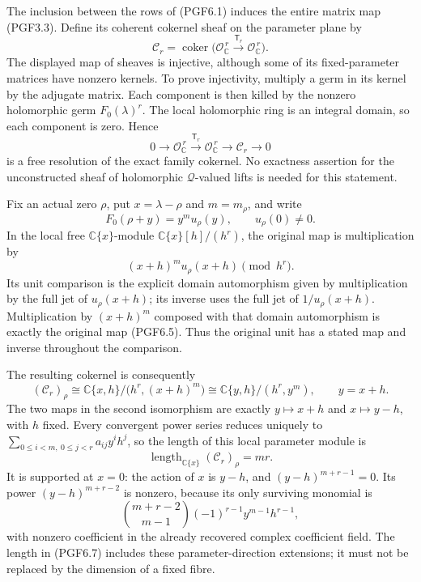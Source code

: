 The inclusion between the rows of (PGF6.1) induces the entire matrix map
(PGF3.3). Define its coherent cokernel sheaf on the parameter plane by
\[
\mathscr C_r=
\operatorname{coker}\bigl(\mathcal O_{\mathbb C}^{\,r}
\xrightarrow{\mathsf T_r}\mathcal O_{\mathbb C}^{\,r}\bigr).
\tag{PGF6.2}
\] The displayed map of sheaves is injective, although some of its
fixed-parameter matrices have nonzero kernels. To prove injectivity,
multiply a germ in its kernel by the adjugate matrix. Each component is
then killed by the nonzero holomorphic germ \(F_0(\lambda)^r\). The
local holomorphic ring is an integral domain, so each component is zero.
Hence \[
0\to\mathcal O_{\mathbb C}^{\,r}
\xrightarrow{\mathsf T_r}\mathcal O_{\mathbb C}^{\,r}
\to\mathscr C_r\to0
\tag{PGF6.3}
\] is a free resolution of the exact family cokernel. No exactness
assertion for the unconstructed sheaf of holomorphic
\(\mathcal Q\)-valued lifts is needed for this statement.

Fix an actual zero \(\rho\), put \(x=\lambda-\rho\) and \(m=m_\rho\),
and write \[
F_0(\rho+y)=y^m u_\rho(y),\qquad u_\rho(0)\ne0.
\tag{PGF6.4}
\] In the local free \(\mathbb C\{x\}\)-module
\(\mathbb C\{x\}[h]/(h^r)\), the original map is multiplication by \[
(x+h)^m u_\rho(x+h)\pmod{h^r}.
\tag{PGF6.5}
\] Its unit comparison is the explicit domain automorphism given by
multiplication by the full jet of \(u_\rho(x+h)\); its inverse uses the
full jet of \(1/u_\rho(x+h)\). Multiplication by \((x+h)^m\) composed
with that domain automorphism is exactly the original map (PGF6.5). Thus
the original unit has a stated map and inverse throughout the
comparison.

The resulting cokernel is consequently \[
(\mathscr C_r)_\rho
\cong \mathbb C\{x,h\}/\bigl(h^r,(x+h)^m\bigr)
\cong \mathbb C\{y,h\}/(h^r,y^m),\qquad y=x+h.
\tag{PGF6.6}
\] The two maps in the second isomorphism are exactly \(y\mapsto x+h\)
and \(x\mapsto y-h\), with \(h\) fixed. Every convergent power series
reduces uniquely to \(\sum_{0\le i<m,\ 0\le j<r}a_{ij}y^ih^j\), so the
length of this local parameter module is \[
\operatorname{length}_{\mathbb C\{x\}}(\mathscr C_r)_\rho=mr.
\tag{PGF6.7}
\] It is supported at \(x=0\): the action of \(x\) is \(y-h\), and
\((y-h)^{m+r-1}=0\). Its power \((y-h)^{m+r-2}\) is nonzero, because its
only surviving monomial is \[
\binom{m+r-2}{m-1}(-1)^{r-1}y^{m-1}h^{r-1},
\tag{PGF6.8}
\] with nonzero coefficient in the already recovered complex coefficient
field. The length in (PGF6.7) includes these parameter-direction
extensions; it must not be replaced by the dimension of a fixed fibre.

